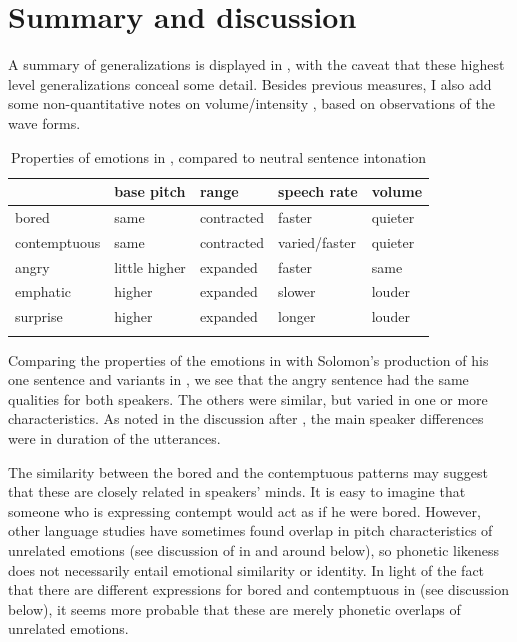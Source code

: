 \documentclass[output=paper]{langsci/langscibook}
\begin{document}
\section{Summary and discussion}

A summary of generalizations is displayed in , with the caveat that these highest level generalizations conceal some detail. Besides previous measures, I also add some non-quantitative notes on volume/intensity , based on observations of the wave forms. 


\begin{table}
\begin{tabular}{lllll} 
\lsptoprule
& base pitch & range & speech rate & volume\\\midrule
bored & same & contracted & faster & quieter\\
contemptuous & same & contracted & varied/faster & quieter\\
angry & little higher & expanded & faster & same\\
emphatic & higher & expanded & slower & louder\\
surprise & higher & expanded & longer & louder\\
\lspbottomrule
\end{tabular}

\caption{Properties of emotions in , compared to neutral sentence intonation}
\label{tab:5.cahill}

\end{table}


Comparing the properties of the emotions in  with Solomon's production of his one sentence and variants in , we see that the angry sentence had the same qualities for both speakers. The others were similar, but varied in one or more characteristics. As noted in the discussion after , the main speaker differences were in duration of the utterances.

The similarity between the bored and the contemptuous patterns may suggest that these are closely related in  speakers' minds. It is easy to imagine that someone who is expressing contempt would act as if he were bored. However, other language studies have sometimes found overlap in pitch characteristics of unrelated emotions (see discussion of  in and around  below), so phonetic likeness does not necessarily entail emotional similarity or identity. In light of the fact that there are different expressions for bored and contemptuous in  (see discussion below), it seems more probable that these are merely phonetic overlaps of unrelated emotions.
\end{document}
